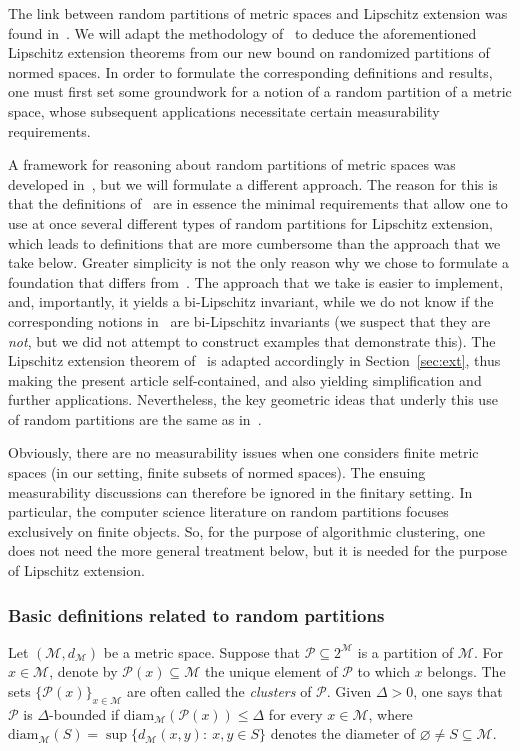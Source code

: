 \documentclass[11pt,reqno]{amsart}
\renewcommand{\le}{\leqslant}
\newcommand{\diam}{\mathrm{diam}}
\theoremstyle{remark}
\newcommand{\MM}{\mathcal{M}}
\renewcommand{\subset}{\subseteq}
\renewcommand{\emptyset}{\varnothing}
\renewcommand{\1}{\mathbf 1}
\newcommand{\Part}{\mathscr{P}}
\begin{document}
The link between random partitions of metric spaces and Lipschitz extension was found in~\cite{LN05}. We will adapt the methodology of~\cite{LN05} to deduce the aforementioned  Lipschitz extension theorems from our new bound on randomized partitions of normed spaces. In order to formulate the corresponding definitions and results, one must first set  some groundwork for a  notion of a random partition of a metric space, whose subsequent applications  necessitate certain measurability requirements.

A framework for reasoning about random partitions of metric spaces was developed in~\cite{LN05}, but  we will formulate a  different approach. The reason for this is that the definitions of~\cite{LN05} are in essence  the minimal requirements that allow one to use at once several different types of random partitions for  Lipschitz extension, which leads to definitions that are more cumbersome than the approach that we take below. Greater simplicity is not the only reason why we chose  to formulate a foundation that differs from~\cite{LN05}. The approach that we take  is easier to implement, and, importantly, it yields a bi-Lipschitz invariant, while we do not know if the corresponding notions in~\cite{LN05} are bi-Lipschitz invariants (we suspect that they are {\em not}, but we did not attempt to construct examples that demonstrate this). The Lipschitz extension theorem of~\cite{LN05} is adapted accordingly in Section~\ref{sec:ext}, thus making the present article self-contained, and also yielding simplification  and further applications. Nevertheless, the key geometric ideas that underly this use of random partitions are the same as in~\cite{LN05}.

Obviously, there are no measurability issues when one considers finite metric spaces (in our setting, finite subsets of normed spaces). The ensuing measurability discussions can therefore be ignored in the finitary setting. In particular, the computer science literature on random partitions  focuses exclusively on finite objects. So, for the purpose of algorithmic clustering, one does not need the more general treatment below, but it is needed for the purpose of Lipschitz extension.

\vspace{-0.1in}
\subsubsection{Basic definitions related to random partitions}\label{sec:random partition intro} Let $(\MM,d_\MM)$ be a metric space. Suppose that $\Part\subset 2^\MM$ is a partition of $\MM$. For $x\in \MM$, denote by $\mathscr{P}(x)\subset \MM$ the unique element of $\mathscr{P}$ to which $x$ belongs. The sets $\{\Part(x)\}_{x\in \MM}$ are often called the {\em clusters} of $\Part$. Given $\Delta>0$, one says that $\mathscr{P}$ is  $\Delta$-bounded if $\diam_\MM(\Part(x))\le \Delta$ for every $x\in \MM$, where $\diam_\MM(S)=\sup\{d_\MM(x,y):\ x,y\in S\}$ denotes the diameter of $\emptyset \neq S\subset \MM$.
\end{document}
